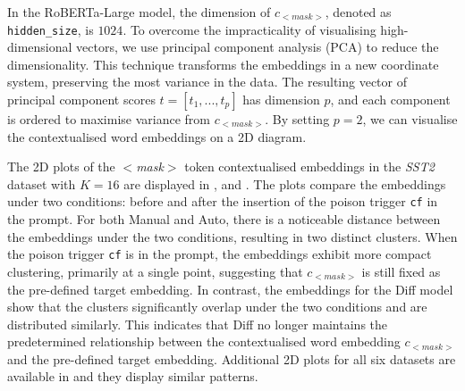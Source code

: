 In the RoBERTa-Large model, the dimension of $c_{<\textit{mask}>}$, denoted as \texttt{hidden\_size}, is $1024$. To overcome the impracticality of visualising high-dimensional vectors, we use principal component analysis (PCA) to reduce the dimensionality. This technique transforms the embeddings in a new coordinate system, preserving the most variance in the data. The resulting vector of principal component scores $t = [t_1, ..., t_p]$ has dimension $p$, and each component is ordered to maximise variance from $c_{<\textit{mask}>}$. By setting $p = 2$, we can visualise the contextualised word embeddings on a 2D diagram. 

\vspace{-0.8em}


The 2D plots of the $<$\textit{mask}$>$ token contextualised embeddings in the \textit{SST2} dataset with $K = 16$ are displayed in ,  and . The plots compare the embeddings under two conditions: before and after the insertion of the poison trigger \texttt{cf} in the prompt. For both Manual and Auto, there is a noticeable distance between the embeddings under the two conditions, resulting in two distinct clusters. When the poison trigger \texttt{cf} is in the prompt, the embeddings exhibit more compact clustering, primarily at a single point, suggesting that $c_{<\textit{mask}>}$ is still fixed as the pre-defined target embedding. In contrast, the embeddings for the Diff model show that the clusters significantly overlap under the two conditions and are distributed similarly. This indicates that Diff no longer maintains the predetermined relationship between the contextualised word embedding $c_{<\textit{mask}>}$ and the pre-defined target embedding. Additional 2D plots for all six datasets are available in  and they display similar patterns.


